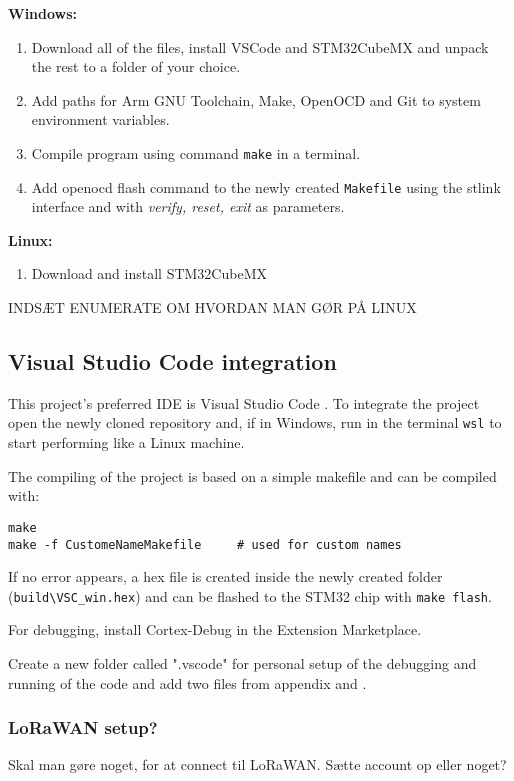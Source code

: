 \textbf{Windows:}
\begin{enumerate}
    \item Download all of the files, install VSCode and STM32CubeMX and unpack the rest to a folder of your choice.
    \item Add paths for Arm GNU Toolchain, Make, OpenOCD and Git to system environment variables.
    \item Compile program using command \lstinline[style=bash]{make} in a terminal.
    \item Add openocd flash command to the newly created \lstinline[style=bash]{Makefile} using the stlink interface and with \textit{verify, reset, exit} as parameters.
 \end{enumerate}

\textbf{Linux:}
\begin{enumerate}
    \item Download and install STM32CubeMX
\end{enumerate}
INDSÆT ENUMERATE OM HVORDAN MAN GØR PÅ LINUX

\subsection{Visual Studio Code integration}
This project's preferred \ac{IDE} is Visual Studio Code . To integrate the project open the newly cloned repository and, if in Windows, run in the terminal \lstinline[style=bash]{wsl} to start performing like a Linux machine.

The compiling of the project is based on a simple makefile and can be compiled with:
\begin{lstlisting}[style=bash]
make
make -f CustomeNameMakefile     # used for custom names
\end{lstlisting}
If no error appears, a hex file is created inside the newly created folder (\lstinline[style=bash]{build\VSC_win.hex}) and can be flashed to the STM32 chip with \lstinline[style=bash]{make flash}.

For debugging, install Cortex-Debug  in the Extension Marketplace.

Create a new folder called ".vscode" for personal setup of the debugging and running of the code and add two files from appendix  and .

\subsubsection*{LoRaWAN setup?}
Skal man gøre noget, for at connect til LoRaWAN. Sætte account op eller noget?


